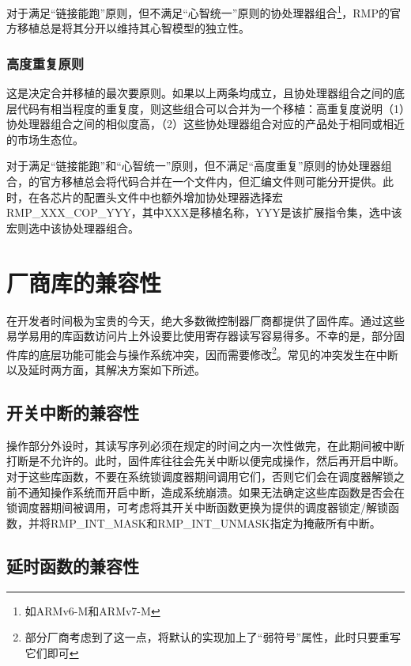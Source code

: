 对于满足``链接能跑''原则，但不满足``心智统一''原则的协处理器组合\footnote{如ARMv6-M和ARMv7-M}，RMP的官方移植总是将其分开以维持其心智模型的独立性。

\subsubsection{高度重复原则}\label{subsubsec:the-high-repetition-rule}

这是决定合并移植的最次要原则。如果以上两条均成立，且协处理器组合之间的底层代码有相当程度的重复度，则这些组合可以合并为一个移植：高重复度说明（1）协处理器组合之间的相似度高，（2）这些协处理器组合对应的产品处于相同或相近的市场生态位。

对于满足``链接能跑''和``心智统一''原则，但不满足``高度重复''原则的协处理器组合，的官方移植总会将代码合并在一个文件内，但汇编文件则可能分开提供。此时，在各芯片的配置头文件中也额外增加协处理器选择宏RMP\_XXX\_COP\_YYY，其中XXX是移植名称，YYY是该扩展指令集，选中该宏则选中该协处理器组合。

\section{厂商库的兼容性}\label{sec:vendor-library-compatibility}

在开发者时间极为宝贵的今天，绝大多数微控制器厂商都提供了固件库。通过这些易学易用的库函数访问片上外设要比使用寄存器读写容易得多。不幸的是，部分固件库的底层功能可能会与操作系统冲突，因而需要修改\footnote{部分厂商考虑到了这一点，将默认的实现加上了``弱符号''属性，此时只要重写它们即可}。常见的冲突发生在中断以及延时两方面，其解决方案如下所述。

\subsection{开关中断的兼容性}\label{subsec:interrupt-enable-disable-compatibility}

操作部分外设时，其读写序列必须在规定的时间之内一次性做完，在此期间被中断打断是不允许的。此时，固件库往往会先关中断以便完成操作，然后再开启中断。对于这些库函数，不要在系统锁调度器期间调用它们，否则它们会在调度器解锁之前不通知操作系统而开启中断，造成系统崩溃。如果无法确定这些库函数是否会在锁调度器期间被调用，可考虑将其开关中断函数更换为提供的调度器锁定/解锁函数，并将RMP\_INT\_MASK和RMP\_INT\_UNMASK指定为掩蔽所有中断。

\subsection{延时函数的兼容性}\label{subsec:delay-function-compatibility}

